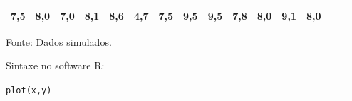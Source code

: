 \documentclass[12pt,brazil,]{book}
\begin{document}
\begin{longtable}[]{@{}lllllllllllllll@{}}
\begin{minipage}[t]{0.04\columnwidth}
7,5\strut
\end{minipage} & \begin{minipage}[t]{0.04\columnwidth}\raggedright
8,0\strut
\end{minipage} & \begin{minipage}[t]{0.04\columnwidth}\raggedright
7,0\strut
\end{minipage} & \begin{minipage}[t]{0.04\columnwidth}\raggedright
8,1\strut
\end{minipage} & \begin{minipage}[t]{0.04\columnwidth}\raggedright
8,6\strut
\end{minipage} & \begin{minipage}[t]{0.04\columnwidth}\raggedright
4,7\strut
\end{minipage} & \begin{minipage}[t]{0.04\columnwidth}\raggedright
7,5\strut
\end{minipage} & \begin{minipage}[t]{0.04\columnwidth}\raggedright
9,5\strut
\end{minipage} & \begin{minipage}[t]{0.04\columnwidth}\raggedright
9,5\strut
\end{minipage} & \begin{minipage}[t]{0.04\columnwidth}\raggedright
7,8\strut
\end{minipage} & \begin{minipage}[t]{0.04\columnwidth}\raggedright
8,0\strut
\end{minipage} & \begin{minipage}[t]{0.04\columnwidth}\raggedright
9,1\strut
\end{minipage} & \begin{minipage}[t]{0.04\columnwidth}\raggedright
8,0\strut
\end{minipage}\tabularnewline
\bottomrule
\end{longtable}

Fonte: Dados simulados.

Sintaxe no software R:

\texttt{plot(x,y)}
\end{document}

